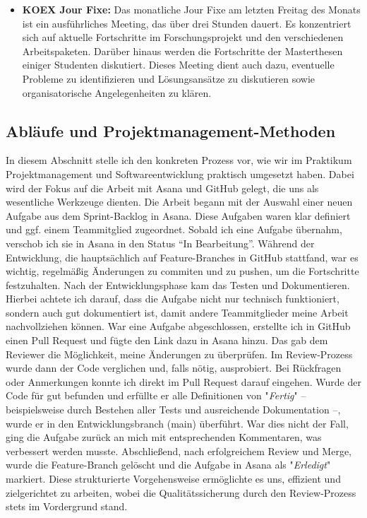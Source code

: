 \documentclass[11pt]{article}
\begin{document}
\begin{itemize}
    \item \textbf{KOEX Jour Fixe:} \newline
    Das monatliche Jour Fixe am letzten Freitag des Monats ist ein ausführliches Meeting, das über drei Stunden dauert. Es konzentriert sich auf aktuelle Fortschritte im Forschungsprojekt und den verschiedenen Arbeitspaketen. Darüber hinaus werden die Fortschritte der Masterthesen einiger Studenten diskutiert. Dieses Meeting dient auch dazu, eventuelle Probleme zu identifizieren und Lösungsansätze zu diskutieren sowie organisatorische Angelegenheiten zu klären.
\end{itemize}

\subsection{Abläufe und Projektmanagement-Methoden}
In diesem Abschnitt stelle ich den konkreten Prozess vor, wie wir im Praktikum Projektmanagement und Softwareentwicklung praktisch umgesetzt haben. Dabei wird der Fokus auf die Arbeit mit Asana und GitHub gelegt, die uns als wesentliche Werkzeuge dienten.
\newline
Die Arbeit begann mit der Auswahl einer neuen Aufgabe aus dem Sprint-Backlog in Asana. Diese Aufgaben waren klar definiert und ggf. einem Teammitglied zugeordnet. Sobald ich eine Aufgabe übernahm, verschob ich sie in Asana in den Status ``In Bearbeitung''. Während der Entwicklung, die hauptsächlich auf Feature-Branches in GitHub stattfand, war es wichtig, regelmäßig Änderungen zu commiten und zu pushen, um die Fortschritte festzuhalten. Nach der Entwicklungsphase kam das Testen und Dokumentieren. Hierbei achtete ich darauf, dass die Aufgabe nicht nur technisch funktioniert, sondern auch gut dokumentiert ist, damit andere Teammitglieder meine Arbeit nachvollziehen können.
\newline
War eine Aufgabe abgeschlossen, erstellte ich in GitHub einen Pull Request und fügte den Link dazu in Asana hinzu. Das gab dem Reviewer die Möglichkeit, meine Änderungen zu überprüfen. Im Review-Prozess wurde dann der Code verglichen und, falls nötig, ausprobiert. Bei Rückfragen oder Anmerkungen konnte ich direkt im Pull Request darauf eingehen. Wurde der Code für gut befunden und erfüllte er alle Definitionen von "\textit{Fertig}" – beispielsweise durch Bestehen aller Tests und ausreichende Dokumentation –, wurde er in den Entwicklungsbranch (main) überführt. War dies nicht der Fall, ging die Aufgabe zurück an mich mit entsprechenden Kommentaren, was verbessert werden musste.
\newline
Abschließend, nach erfolgreichem Review und Merge, wurde die Feature-Branch gelöscht und die Aufgabe in Asana als "\textit{Erledigt}" markiert. Diese strukturierte Vorgehensweise ermöglichte es uns, effizient und zielgerichtet zu arbeiten, wobei die Qualitätssicherung durch den Review-Prozess stets im Vordergrund stand.
\end{document}

